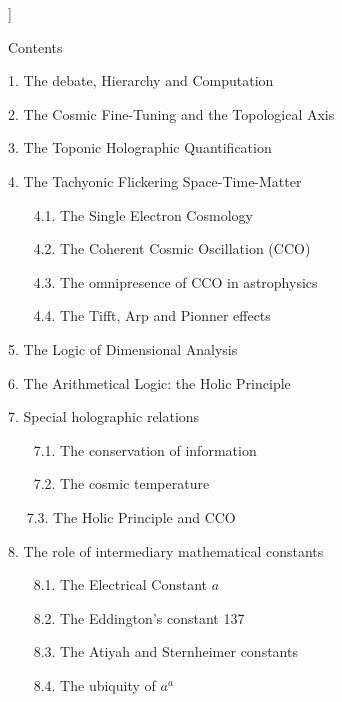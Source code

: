\documentclass[twoside,draft]{article}
\begin{document}
\begin{sloppypar}
\begin{center}
{{%

}}\smallskip
\end{center}]{%


\setcounter{section}{0}
\setcounter{equation}{0}
\setcounter{figure}{0}
\setcounter{table}{0}
\setcounter{page}{1}


Contents

1. The debate, Hierarchy and Computation

2. The Cosmic Fine-Tuning and the Topological Axis

3. The Toponic Holographic Quantification

4. The Tachyonic Flickering Space-Time-Matter}

~~~   4.1. The Single Electron Cosmology
   
~~~    4.2. The Coherent Cosmic Oscillation (CCO)
   
~~~    4.3. The omnipresence of CCO in astrophysics
   
~~~    4.4. The Tifft, Arp and Pionner effects
   
5. The Logic of Dimensional Analysis

6. The Arithmetical Logic: the Holic Principle

7. Special holographic relations

~~~    7.1. The conservation of information
   
~~~    7.2. The cosmic temperature

~~     7.3. The Holic Principle and CCO 
    
8. The role of intermediary mathematical constants

~~~    8.1. The Electrical Constant $a$

~~~    8.2. The Eddington's constant 137
   
~~~    8.3. The Atiyah and Sternheimer constants
   
~~~    8.4. The ubiquity of $a^a$
   

\end{sloppypar}
\end{document}
